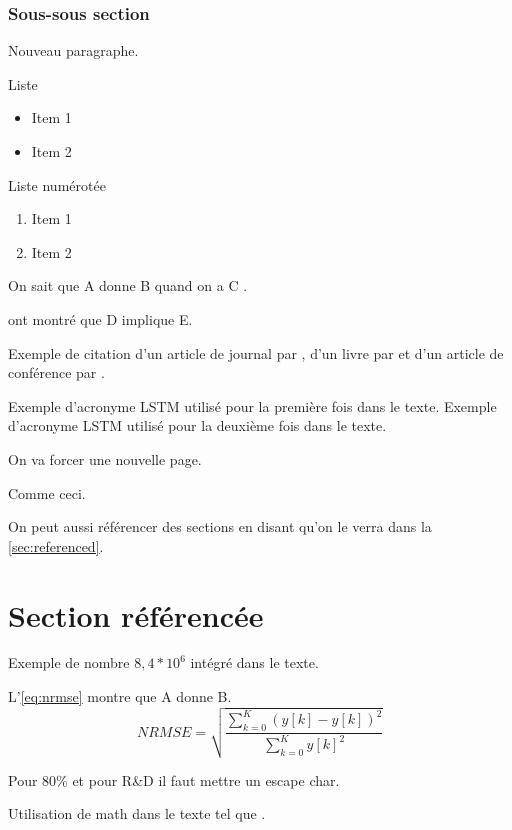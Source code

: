 \documentclass[a4paper]{article}
\begin{document}
\subsubsection{Sous-sous section}

\par Nouveau paragraphe.

Liste
\begin{itemize}
  \item Item 1
  \item Item 2
\end{itemize}

Liste numérotée
\begin{enumerate}
  \item Item 1
  \item Item 2
\end{enumerate}

On sait que A donne B quand on a C \citep{cho2014}.

\cite{cho2014} ont montré que D implique E.

Exemple de citation d'un article de journal par \cite{Schmitz2019}, d'un livre par \cite{Bracewell1986} et d'un article de conférence par \cite{Wright2019}.

Exemple d'acronyme \ac{LSTM} utilisé pour la première fois dans le texte.
Exemple d'acronyme \ac{LSTM} utilisé pour la deuxième fois dans le texte.

On va forcer une nouvelle page.

\newpage

Comme ceci.

On peut aussi référencer des sections en disant qu'on le verra dans la \autoref{sec:referenced}.

\section{Section référencée}
\label{sec:referenced}

Exemple de nombre $ 8,4*10 ^{6} $ intégré dans le texte.

L'\autoref{eq:nrmse} montre que A donne B.
\begin{equation}
NRMSE = \sqrt{\dfrac{\sum_{k=0}^{K}(y[k] - \hat{y}[k])^{2}}{\sum_{k=0}^{K}y[k]^{2}}}
\label{eq:nrmse}
\end{equation}

Pour 80\% et pour R\&D il faut mettre un escape char.

Utilisation de math dans le texte tel que \textmu.
\end{document}

